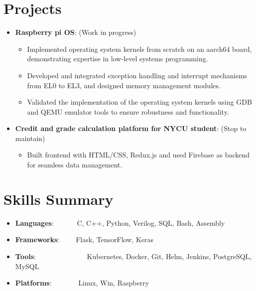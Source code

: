 \documentclass[letterpaper, 11pt]{extarticle}
\newcommand{\resumeItem}[2]{
  \item\small{
    \textbf{#1}{: #2 \vspace{-2pt}}
  }
}
\newcommand{\resumeSubItem}[2]{\resumeItem{#1}{#2}\vspace{-3pt}}
\newcommand{\resumeSubHeadingListStart}{\begin{itemize}[leftmargin=*]}
\newcommand{\resumeSubHeadingListEnd}{\end{itemize}}
\begin{document}
\section{Projects}
  \resumeSubHeadingListStart
    \resumeSubItem{Raspberry pi OS}{(Work in progress)}
      \begin{itemize}
        \setlength\itemsep{0.001em}
		\item Implemented operating system kernels from scratch on an aarch64 board, demonstrating expertise in low-level systems programming.
        \item Developed and integrated exception handling and interrupt mechanisms from EL0 to EL3, and designed memory management modules.
        \item Validated the implementation of the operating system kernels using GDB and QEMU emulator tools to ensure robustness and functionality.
	 \end{itemize}
    \vspace{2pt}
    \resumeSubItem{Credit and grade calculation platform for NYCU student}{(Stop to maintain)}
      \begin{itemize}
        \setlength\itemsep{0.001em}
		\item Built frontend with HTML/CSS, Redux.js and used Firebase as backend for seamless data management.
	 \end{itemize}
    \vspace{2pt}
\resumeSubHeadingListEnd
\vspace{-5pt}

\section{Skills Summary}
  \resumeSubHeadingListStart
	\resumeSubItem{Languages}{~~~~~~C, C++, Python, Verilog, SQL, Bash, Assembly}
	\resumeSubItem{Frameworks}{~~~~Flask, TensorFlow, Keras}
	\resumeSubItem{Tools}{~~~~~~~~~~~~~~Kubernetes, Docker, Git, Helm, Jenkins, PostgreSQL, MySQL}
	\resumeSubItem{Platforms}{~~~~~~~Linux, Win, Raspberry}
  \resumeSubHeadingListEnd
\end{document}
